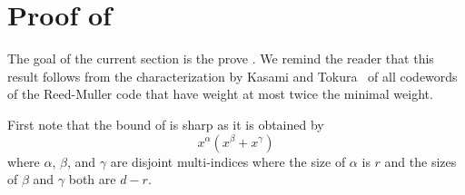 \appendix
\section{Proof of }

The goal of the current section is the prove 
.
We remind the reader that this result
follows from the characterization by
Kasami and Tokura~\cite{kt70} of 
all codewords of the Reed-Muller code
that have weight at most twice the
minimal weight.

First note that the bound of  is
sharp as it is obtained by
$$x^\alpha (x^\beta+x^\gamma)$$ where $\alpha$,
$\beta$, and $\gamma$ are disjoint multi-indices
where the size of $\alpha$ is $r$ and the sizes
of $\beta$ and $\gamma$ both are $d-r$.

